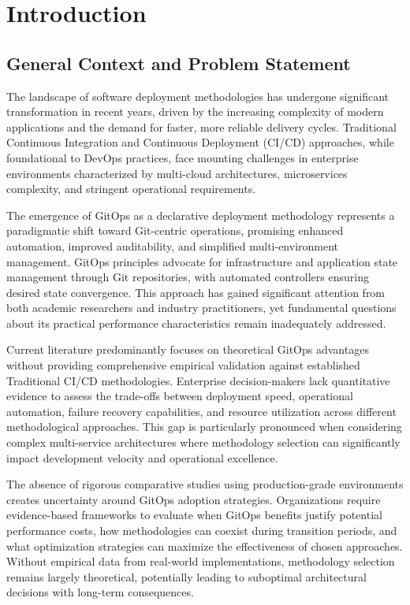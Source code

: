 \chapter{Introduction}

\section{General Context and Problem Statement}

The landscape of software deployment methodologies has undergone significant transformation in recent years, driven by the increasing complexity of modern applications and the demand for faster, more reliable delivery cycles. Traditional Continuous Integration and Continuous Deployment (CI/CD) approaches, while foundational to DevOps practices, face mounting challenges in enterprise environments characterized by multi-cloud architectures, microservices complexity, and stringent operational requirements.

The emergence of GitOps as a declarative deployment methodology represents a paradigmatic shift toward Git-centric operations, promising enhanced automation, improved auditability, and simplified multi-environment management. GitOps principles advocate for infrastructure and application state management through Git repositories, with automated controllers ensuring desired state convergence. This approach has gained significant attention from both academic researchers and industry practitioners, yet fundamental questions about its practical performance characteristics remain inadequately addressed.

Current literature predominantly focuses on theoretical GitOps advantages without providing comprehensive empirical validation against established Traditional CI/CD methodologies. Enterprise decision-makers lack quantitative evidence to assess the trade-offs between deployment speed, operational automation, failure recovery capabilities, and resource utilization across different methodological approaches. This gap is particularly pronounced when considering complex multi-service architectures where methodology selection can significantly impact development velocity and operational excellence.

The absence of rigorous comparative studies using production-grade environments creates uncertainty around GitOps adoption strategies. Organizations require evidence-based frameworks to evaluate when GitOps benefits justify potential performance costs, how methodologies can coexist during transition periods, and what optimization strategies can maximize the effectiveness of chosen approaches. Without empirical data from real-world implementations, methodology selection remains largely theoretical, potentially leading to suboptimal architectural decisions with long-term consequences.

